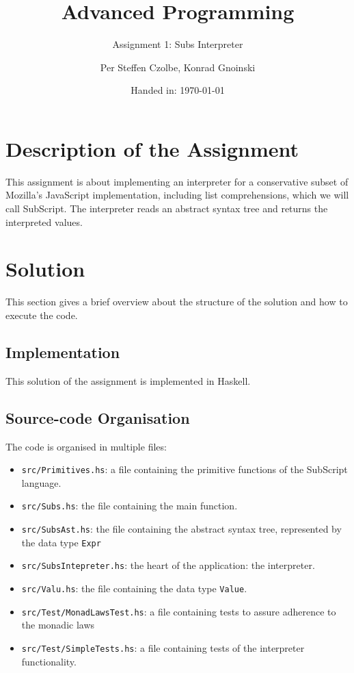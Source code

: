 \documentclass[11pt, a4paper]{article}
\author{Per Steffen Czolbe, Konrad Gnoinski}
\title{Advanced Programming}
\subtitle{Assignment 1: Subs Interpreter} %
\date{Handed in: \today}
\begin{document}
\maketitle

\tableofcontents

\section{Description of the Assignment}
This assignment is about implementing an interpreter for a conservative subset of Mozilla’s JavaScript implementation, including list comprehensions, which we will call SubScript. The interpreter reads an abstract syntax tree and returns the interpreted values.

\section{Solution}
This section gives a brief overview about the structure of the solution and how to execute the code.

\subsection{Implementation}
This solution of the assignment is implemented in Haskell.

\subsection{Source-code Organisation}
The code is organised in multiple files:
\begin{itemize}
	\item \texttt{src/Primitives.hs}: a file containing the primitive functions of the SubScript language.
	\item \texttt{src/Subs.hs}: the file containing the main function.
	\item \texttt{src/SubsAst.hs}: the file containing the abstract syntax tree, represented by the data type \texttt{Expr}
	\item \texttt{src/SubsIntepreter.hs}: the heart of the application: the interpreter.
	\item \texttt{src/Valu.hs}: the file containing the data type \texttt{Value}.
	\item \texttt{src/Test/MonadLawsTest.hs}: a file containing tests to assure adherence to the monadic laws
	\item \texttt{src/Test/SimpleTests.hs}: a file containing tests of the interpreter functionality.
\end{itemize}
\end{document}
